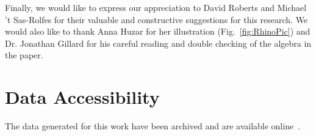 \documentclass[10pt]{article}
\begin{document}
Finally, we would like to express our appreciation to David Roberts and Michael 't
Sas-Rolfes for their valuable and constructive suggestions for this research.
We would also like to thank Anna Huzar for her illustration (Fig.~\ref{fig:RhinoPic}) and
Dr. Jonathan Gillard for his careful reading and double checking of the algebra in the paper.

\section*{Data Accessibility}

The data generated for this work have been archived and are available
online~\citep{Glynatsi2017}.



\end{document}
